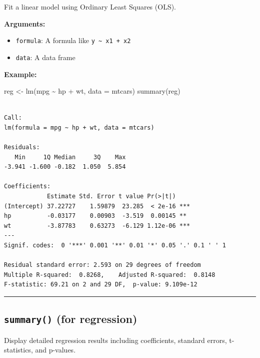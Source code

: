 \documentclass[
  letterpaper,
  DIV=11,
  numbers=noendperiod]{scrreprt}
\newenvironment{Shaded}{\begin{snugshade}}{\end{snugshade}}
\newcommand{\AttributeTok}[1]{\textcolor[rgb]{0.40,0.45,0.13}{#1}}
\newcommand{\FunctionTok}[1]{\textcolor[rgb]{0.28,0.35,0.67}{#1}}
\newcommand{\NormalTok}[1]{\textcolor[rgb]{0.00,0.23,0.31}{#1}}
\newcommand{\OtherTok}[1]{\textcolor[rgb]{0.00,0.23,0.31}{#1}}
\newcommand{\SpecialCharTok}[1]{\textcolor[rgb]{0.37,0.37,0.37}{#1}}
\providecommand{\tightlist}{%
  \setlength{\itemsep}{0pt}\setlength{\parskip}{0pt}}
\begin{document}
Fit a linear model using Ordinary Least Squares (OLS).

\textbf{Arguments:}

\begin{itemize}
\tightlist
\item
  \texttt{formula}: A formula like
  \texttt{y\ \textasciitilde{}\ x1\ +\ x2}
\item
  \texttt{data}: A data frame
\end{itemize}

\textbf{Example:}

\begin{Shaded}
\begin{Highlighting}[]
\NormalTok{reg }\OtherTok{\textless{}{-}} \FunctionTok{lm}\NormalTok{(mpg }\SpecialCharTok{\textasciitilde{}}\NormalTok{ hp }\SpecialCharTok{+}\NormalTok{ wt, }\AttributeTok{data =}\NormalTok{ mtcars)}
\FunctionTok{summary}\NormalTok{(reg)}
\end{Highlighting}
\end{Shaded}

\begin{verbatim}

Call:
lm(formula = mpg ~ hp + wt, data = mtcars)

Residuals:
   Min     1Q Median     3Q    Max 
-3.941 -1.600 -0.182  1.050  5.854 

Coefficients:
            Estimate Std. Error t value Pr(>|t|)    
(Intercept) 37.22727    1.59879  23.285  < 2e-16 ***
hp          -0.03177    0.00903  -3.519  0.00145 ** 
wt          -3.87783    0.63273  -6.129 1.12e-06 ***
---
Signif. codes:  0 '***' 0.001 '**' 0.01 '*' 0.05 '.' 0.1 ' ' 1

Residual standard error: 2.593 on 29 degrees of freedom
Multiple R-squared:  0.8268,    Adjusted R-squared:  0.8148 
F-statistic: 69.21 on 2 and 29 DF,  p-value: 9.109e-12
\end{verbatim}

\begin{center}\rule{0.5\linewidth}{0.5pt}\end{center}

\subsection{\texorpdfstring{\texttt{summary()} (for
regression)}{summary() (for regression)}}\label{summary-for-regression}

Display detailed regression results including coefficients, standard
errors, t-statistics, and p-values.
\end{document}
